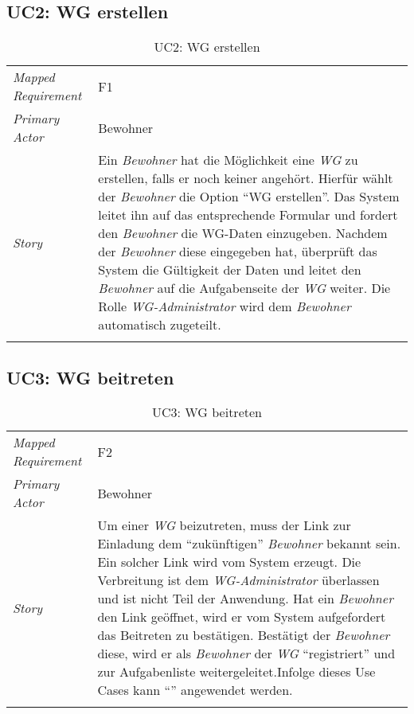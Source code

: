 \subsection{UC2: WG erstellen}\label{subsec:uc2}
\begin{table}[H]
	\tablestyle
	\tablealtcolored
	\begin{tabularx}{\textwidth}{lX}
		\tablebody
			\textit{Mapped Requirement} &
			F1
			\tabularnewline
			\textit{Primary Actor} &
			Bewohner
			\tabularnewline
			\textit{Story} &
			Ein \emph{Bewohner} hat die Möglichkeit eine \emph{WG} zu erstellen, falls er noch keiner angehört. Hierfür wählt der \emph{Bewohner} die Option ``WG erstellen''. Das System leitet ihn auf das entsprechende Formular und fordert den \emph{Bewohner} die WG-Daten einzugeben. Nachdem der \emph{Bewohner} diese eingegeben hat, überprüft das System die Gültigkeit der Daten und leitet den \emph{Bewohner} auf die Aufgabenseite der \emph{WG} weiter. Die Rolle \emph{WG-Administrator} wird dem \emph{Bewohner} automatisch zugeteilt.
			\tabularnewline
		\tableend
	\end{tabularx}
	\caption{UC2: WG erstellen}
\end{table}


\subsection{UC3: WG beitreten}\label{subsec:uc3}
\begin{table}[H]
	\tablestyle
	\tablealtcolored
	\begin{tabularx}{\textwidth}{lX}
		\tablebody
			\textit{Mapped Requirement} &
			F2
			\tabularnewline
			\textit{Primary Actor} &
			Bewohner
			\tabularnewline
			\textit{Story} &
			Um einer \emph{WG} beizutreten, muss der Link zur Einladung dem ``zukünftigen'' \emph{Bewohner} bekannt sein. Ein solcher Link wird vom System erzeugt. Die Verbreitung ist dem \emph{WG-Administrator} überlassen und ist nicht Teil der Anwendung. Hat ein \emph{Bewohner} den Link geöffnet, wird er vom System aufgefordert das Beitreten zu bestätigen. Bestätigt der \emph{Bewohner} diese, wird er als \emph{Bewohner} der \emph{WG} ``registriert'' und zur Aufgabenliste weitergeleitet.\newline Infolge dieses Use Cases kann ``\nameref{subsec:uc11}'' angewendet werden.
			\tabularnewline
		\tableend
	\end{tabularx}
	\caption{UC3: WG beitreten}
\end{table}



